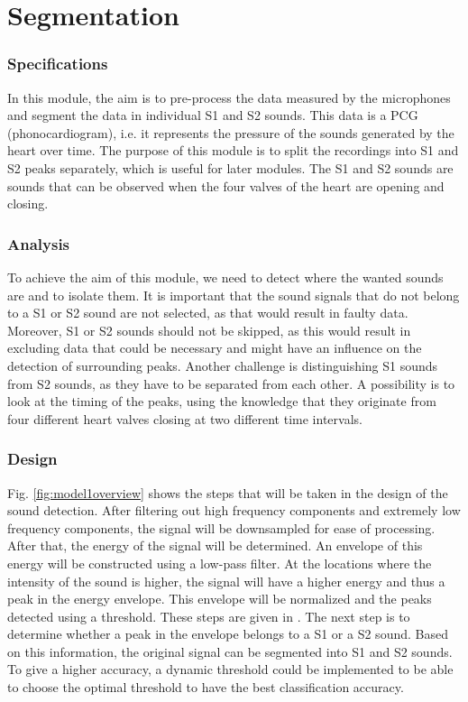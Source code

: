 \chapter{Segmentation}



\subsection{Specifications}

In this module, the aim is to pre-process the data measured by the microphones and segment the data in individual S1 and S2 sounds. This data is a PCG (phonocardiogram), i.e. it represents the pressure of the sounds generated by the heart over time. The purpose of this module is to split the recordings into S1 and S2 peaks separately, which is useful for later modules. The S1 and S2 sounds are sounds that can be observed when the four valves of the heart are opening and closing.

\subsection{Analysis}

To achieve the aim of this module, we need to detect where the wanted sounds are and to isolate them. It is important that the sound signals that do not belong to a S1 or S2 sound are not selected, as that would result in faulty data. Moreover, S1 or S2 sounds should not be skipped, as this would result in excluding data that could be necessary and might have an influence on the detection of surrounding peaks. Another challenge is distinguishing S1 sounds from S2 sounds, as they have to be separated from each other. A possibility is to look at the timing of the peaks, using the knowledge that they originate from four different heart valves closing at two different time intervals.

\subsection{Design}

Fig. \ref{fig:model1overview} shows the steps that will be taken in the design of the sound detection. After filtering out high frequency components and extremely low frequency components, the signal will be downsampled for ease of processing. After that, the energy of the signal will be determined. An envelope of this energy will be constructed using a low-pass filter. At the locations where the intensity of the sound is higher, the signal will have a higher energy and thus a peak in the energy envelope. This envelope will be normalized and the peaks detected using a threshold. These steps are given in \cite{IP3Man}. The next step is to determine whether a peak in the envelope belongs to a S1 or a S2 sound. Based on this information, the original signal can be segmented into S1 and S2 sounds. To give a higher accuracy, a dynamic threshold could be implemented to be able to choose the optimal threshold to have the best classification accuracy.

